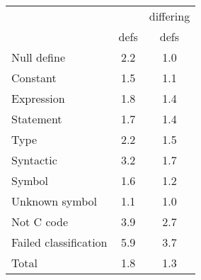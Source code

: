 \begin{tabular}{|l|c|c|} \hline
 & & \multicolumn{1}{c|}{differing} \\
 & \multicolumn{1}{c|}{defs} & \multicolumn{1}{c|}{defs} \\ \hline
Null define & 2.2 & 1.0 \\
Constant & 1.5 & 1.1 \\
Expression & 1.8 & 1.4 \\
Statement & 1.7 & 1.4 \\
Type & 2.2 & 1.5 \\
Syntactic & 3.2 & 1.7 \\
Symbol & 1.6 & 1.2 \\
Unknown symbol & 1.1 & 1.0 \\
Not C code & 3.9 & 2.7 \\
Failed classification & 5.9 & 3.7 \\ \hline
Total & 1.8 & 1.3 \\ \hline
\end{tabular}

